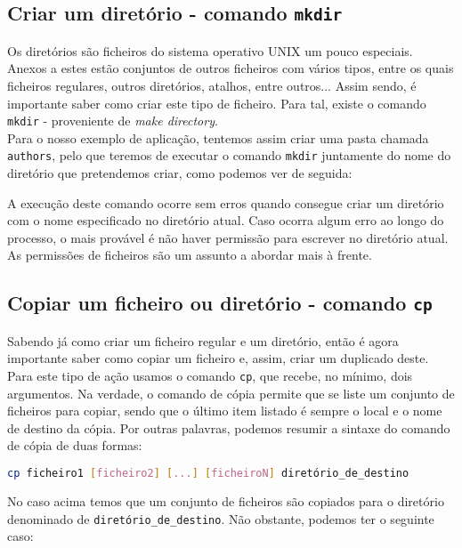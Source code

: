 \documentclass[a4paper, onecolumn, 10pt]{report}
\begin{document}
\subsection{Criar um diretório - comando \texttt{mkdir}}

Os diretórios são ficheiros do sistema operativo UNIX um pouco especiais. Anexos a estes estão conjuntos de outros ficheiros com vários tipos, entre os quais ficheiros regulares, outros diretórios, atalhos, entre outros... Assim sendo, é importante saber como criar este tipo de ficheiro. Para tal, existe o comando \texttt{mkdir} - proveniente de \textit{make directory}. \\
Para o nosso exemplo de aplicação, tentemos assim criar uma pasta chamada \texttt{au\-thors}, pelo que teremos de executar o comando \texttt{mkdir} juntamente do nome do diretório que pretendemos criar, como podemos ver de seguida:



A execução deste comando ocorre sem erros quando consegue criar um diretório com o nome especificado no diretório atual. Caso ocorra algum erro ao longo do processo, o mais provável é não haver permissão para escrever no diretório atual. As permissões de ficheiros são um assunto a abordar mais à frente.

\subsection{Copiar um ficheiro ou diretório - comando \texttt{cp}}

Sabendo já como criar um ficheiro regular e um diretório, então é agora importante saber como copiar um ficheiro e, assim, criar um duplicado deste. Para este tipo de ação usamos o comando \texttt{cp}, que recebe, no mínimo, dois argumentos. Na verdade, o comando de cópia permite que se liste um conjunto de ficheiros para copiar, sendo que o último item listado é sempre o local e o nome de destino da cópia. Por outras palavras, podemos resumir a sintaxe do comando de cópia de duas formas:

\begin{lstlisting}[language=bash, style=console]
cp ficheiro1 [ficheiro2] [...] [ficheiroN] diretório_de_destino
\end{lstlisting}

No caso acima temos que um conjunto de ficheiros são copiados para o diretório denominado de \texttt{diretório\_de\_destino}. Não obstante, podemos ter o seguinte caso:
\end{document}
